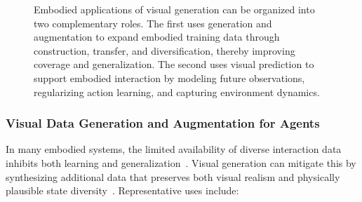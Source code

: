 \begin{figure}[!htbp]
\caption{Embodied applications of visual generation can be organized into two complementary roles. 
The first uses generation and augmentation to expand embodied training data through construction, transfer, and diversification, thereby improving coverage and generalization. 
The second uses visual prediction to support embodied interaction by modeling future observations, regularizing action learning, and capturing environment dynamics.}
\label{fig:embodied_visual_generation}
\end{figure}

\subsubsection{Visual Data Generation and Augmentation for Agents}

In many embodied systems, the limited availability of diverse interaction data inhibits both learning and generalization~\citep{khazatsky2024droid,openx2024rtx,walke2023bridgedatav2}. Visual generation can mitigate this by synthesizing additional data that preserves both visual realism and physically plausible state diversity~\citep{chen2024roviaug,lepert2025phantom,li2025h2r,lepert2025masquerade,fan2026robopaint,song2025mitty}. Representative uses include:

